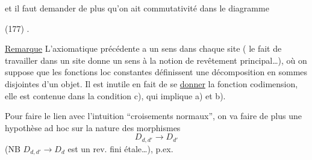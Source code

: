 et il faut demander de plus qu'on ait commutativité dans le  diagramme

(177)\quad
{}.

\uline{Remarque} L'axiomatique précédente a un sens dans chaque site ( le fait de travailler dans un site donne un sens à la notion de revêtement principal\ldots), où on suppose que les fonctions loc constantes définissent une décomposition en sommes disjointes d'un objet. Il est inutile en fait de se \uline{donner} la fonction codimension, elle est contenue dans la condition c), qui implique a) et b).

Pour faire le lien avec l'intuition ``croisements normaux'', on va faire de plus une hypothèse ad hoc sur la nature des morphismes
\[
D_{d,d'}\longrightarrow D_{d'}
\]
(NB $D_{d,d'}\longrightarrow D_d$ est un rev. fini étale\ldots), p.ex.
